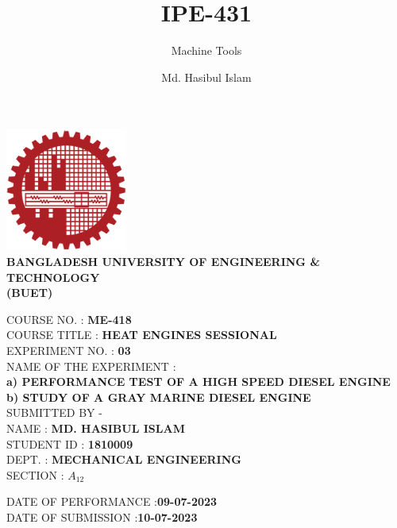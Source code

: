 \documentclass[14pt]{article}
\title{IPE-431}
\author{Md. Hasibul Islam}
\subtitle{Machine Tools}
\date{}
\begin{document}
\begin{titlepage}
    \centering
    \includegraphics[width=4cm]{institution_logo.jpg}\\
    \vspace*{1cm}
    \textbf{\MakeTextUppercase{Bangladesh University of Engineering \& Technology}} \\

    \textbf{\MakeTextUppercase{(BUET)}} \\
    \vspace*{2cm}
    \raggedright
    \MakeTextUppercase{Course No.} : \textbf{ME-418}\\
    \vspace*{0.5cm}
    \MakeTextUppercase{Course Title} : \textbf{HEAT ENGINES SESSIONAL} \\ 
    \vspace*{1cm}
    \MakeTextUppercase{Experiment No.} : \textbf{03} \\
    \vspace*{0.5cm}
    \MakeTextUppercase{Name of the Experiment} : \\
    \textbf{a) PERFORMANCE TEST OF A HIGH SPEED DIESEL ENGINE}\\
    \textbf{b) STUDY OF A GRAY MARINE DIESEL ENGINE}\\
 
    \vspace*{2.5cm} 
    \MakeTextUppercase{Submitted By -} \\
    \vspace*{0.5cm}
    \MakeTextUppercase{Name}        : \hspace{2cm}\textbf{MD. HASIBUL ISLAM} \\
    \vspace*{0.5cm}
    \MakeTextUppercase{Student id}  : \hspace{1cm}\textbf{1810009} \\
    \vspace*{0.5cm}
    \MakeTextUppercase{Dept.}       : \hspace{2cm}\textbf{MECHANICAL ENGINEERING} \\
    \vspace*{0.5cm}
    \MakeTextUppercase{section}     : \hspace{1.5cm}\textbf{$A_{12}$} \\

    \vspace*{2cm}

    \MakeTextUppercase{Date of Performance}     :\hspace{1.5cm}\textbf{09-07-2023}\\
    \vspace*{0.5cm}
    \MakeTextUppercase{Date of Submission}      :\hspace{2cm}\textbf{10-07-2023}\\

    \vfill
\end{titlepage}
\end{document}
